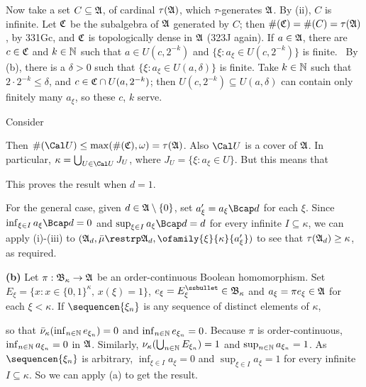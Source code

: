 {\medskip

 Now take a set $C\subseteq\frak A$, of cardinal
$\tau(\frak A)$, which $\tau$-generates $\frak A$.   By (ii), $C$ is
infinite.   Let $\frak C$ be the subalgebra of $\frak A$ generated by
$C$;  then $\#(\frak C)=\#(C)=\tau(\frak A)$, by 331Gc, and $\frak C$ is
topologically dense in $\frak A$ (323J again).
If $a\in\frak A$, there are
$c\in\frak C$ and $k\in\Bbb N$ such that $a\in U(c,2^{-k})$ and
$\{\xi: a_{\xi}\in U(c,2^{-k})\}$ is finite.   \Prf\ By (b), there is a
$\delta>0$ such that $\{\xi: a_{\xi}\in U(a,\delta)\}$ is finite.
Take $k\in\Bbb N$ such that $2\cdot 2^{-k}\le\delta$, and
$c\in\frak C\cap U(a,2^{-k})$;  then
$U(c,2^{-k})\subseteq U(a,\delta)$ can contain only finitely many
$ a_{\xi}$, so these $c$, $k$ serve.\   \Qed

Consider


\noindent Then $\#(\Cal U)\le\max(\#(\frak C),\omega)=\tau(\frak A)$.
Also $\Cal U$ is a cover of $\frak A$.   In particular,
$\kappa=\bigcup_{U\in\Cal U}J_U$, where $J_U=\{\xi: a_{\xi}\in U\}$.
But this means that


\noindent This proves the result when $d=1$.

\medskip

 For the general case, given $d\in\frak A\setminus\{0\}$,
set $a'_{\xi}=a_{\xi}\Bcap d$ for each $\xi$.   Since
$\inf_{\xi\in I}a_{\xi}\Bcap d=0$ and $\sup_{\xi\in I}a_{\xi}\Bcap d=d$ for
every infinite $I\subseteq\kappa$, we can apply (i)-(iii) to
$(\frak A_d,\bar\mu\restrp\frak A_d,\ofamily{\xi}{\kappa}{a'_{\xi}})$ to
see that $\tau(\frak A_d)\ge\kappa$, as required.

\medskip

{\bf (b)} Let $\pi:\frak B_{\kappa}\to\frak A$ be an order-continuous
Boolean homomorphism.
Set $E_{\xi}=\{x:x\in\{0,1\}^{\kappa},\,x(\xi)=1\}$,
$e_{\xi}=E_{\xi}^{\ssbullet}\in\frak B_{\kappa}$ and
$a_{\xi}=\pi e_{\xi}\in\frak A$ for each $\xi<\kappa$.
If $\sequencen{\xi_n}$ is any sequence of distinct elements of $\kappa$,


\noindent so that $\bar\nu_{\kappa}(\inf_{n\in\Bbb N}e_{\xi_n})=0$ and
$\inf_{n\in\Bbb N}e_{\xi_n}=0$.
Because $\pi$ is order-continuous,
$\inf_{n\in\Bbb N}a_{\xi_n}=0$ in $\frak A$.    Similarly,
$\nu_{\kappa}(\bigcup_{n\in\Bbb N}E_{\xi_n})=1$ and
$\sup_{n\in\Bbb N}a_{\xi_n}=1$.   As $\sequencen{\xi_n}$ is arbitrary,
$\inf_{\xi\in I}a_{\xi}=0$ and $\sup_{\xi\in I}a_{\xi}=1$ for every
infinite $I\subseteq\kappa$.   So we can apply (a) to get the result.
}%

